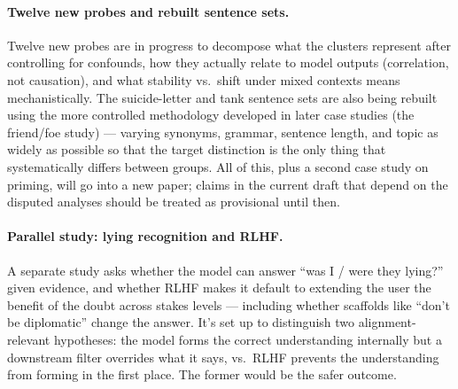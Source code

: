 \documentclass[11pt,a4paper]{article}
\begin{document}
\paragraph{Twelve new probes and rebuilt sentence sets.} Twelve new probes are in progress to decompose what the clusters represent after controlling for confounds, how they actually relate to model outputs (correlation, not causation), and what stability vs.\ shift under mixed contexts means mechanistically. The suicide-letter and tank sentence sets are also being rebuilt using the more controlled methodology developed in later case studies (the friend/foe study) --- varying synonyms, grammar, sentence length, and topic as widely as possible so that the target distinction is the only thing that systematically differs between groups. All of this, plus a second case study on priming, will go into a new paper; claims in the current draft that depend on the disputed analyses should be treated as provisional until then.

\paragraph{Parallel study: lying recognition and RLHF.} A separate study asks whether the model can answer ``was I / were they lying?'' given evidence, and whether RLHF makes it default to extending the user the benefit of the doubt across stakes levels --- including whether scaffolds like ``don't be diplomatic'' change the answer. It's set up to distinguish two alignment-relevant hypotheses: the model forms the correct understanding internally but a downstream filter overrides what it says, vs.\ RLHF prevents the understanding from forming in the first place. The former would be the safer outcome.
\end{document}
